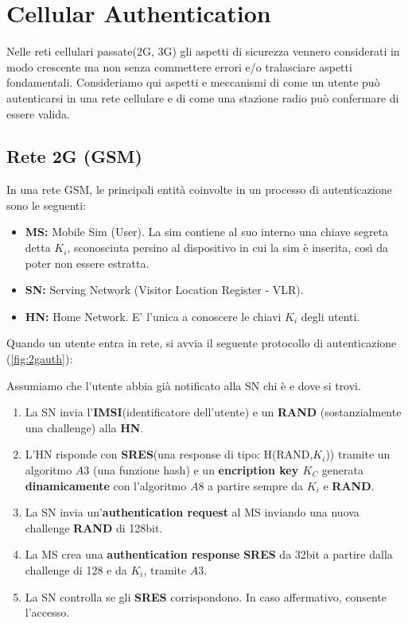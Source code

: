 \chapter{Cellular Authentication}
Nelle reti cellulari passate\footnotemark (2G, 3G) gli aspetti di sicurezza vennero considerati in modo crescente ma non senza commettere errori e/o tralasciare aspetti fondamentali. Consideriamo qui aspetti e meccanismi di come un utente può autenticarsi in una rete cellulare e di come una stazione radio può confermare di essere valida. 
\section{Rete 2G (GSM)}
In una rete GSM, le principali entità coinvolte in un processo di autenticazione sono le seguenti: 
\begin{itemize}
    \item \textbf{MS:} Mobile Sim (User). La sim contiene al suo interno una chiave segreta detta $K_i$\footnotemark, sconosciuta persino al dispositivo in cui la sim è inserita, così da poter non essere estratta.
    \item \textbf{SN:} Serving Network (Visitor Location Register - VLR).
    \item \textbf{HN:} Home Network. E' l'unica a conoscere le chiavi $K_i$ degli utenti.
\end{itemize}
Quando un utente entra in rete, si avvia il seguente protocollo di autenticazione (\cref{fig:2gauth}): 
\begin{proposition}[2G Authentication]\label{prop:2gauth}
Assumiamo che l'utente abbia già notificato alla SN chi è e dove si trovi.
\begin{enumerate}
    \item La SN invia l'\textbf{IMSI}\footnotemark (identificatore dell'utente) e un \textbf{RAND} (sostanzialmente una challenge) alla \textbf{HN}.
    \item L'HN risponde con \textbf{SRES}\footnotemark (una response di tipo: H(RAND,$K_i$)) tramite un algoritmo $A3$ (una funzione hash) e un \textbf{encription key $K_C$} generata \textbf{dinamicamente} con l'algoritmo $A8$ a partire sempre da $K_i$ e \textbf{RAND}.
    \item La SN invia un'\textbf{authentication request} al MS inviando una nuova challenge \textbf{RAND} di 128bit.
    \item La MS crea una \textbf{authentication response} \textbf{SRES} da 32bit a partire dalla challenge di 128 e da $K_i$, tramite $A3$.
    \item La SN controlla se gli \textbf{SRES} corrispondono. In caso affermativo, consente l'accesso.
\end{enumerate}
\end{proposition}
